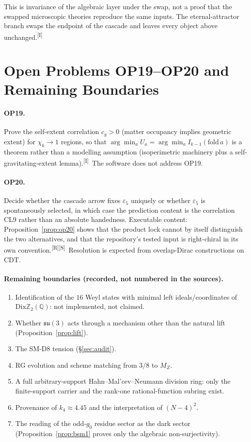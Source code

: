 \documentclass[11pt,a4paper]{article}
\theoremstyle{definition}
\theoremstyle{remark}
\newcommand{\DZ}{\mathrm{Dix}\mathbb{Z}_2(\mathbb{Q})}
\newcommand{\tR}{\textsuperscript{[R]}}
\newcommand{\tS}{\textsuperscript{[S]}}
\newcommand{\tI}{\textsuperscript{[I]}}
\begin{document}
\noindent This is invariance of the algebraic layer under the swap, not a proof that the swapped microscopic theories reproduce the same inputs. The eternal-attractor branch swaps the endpoint of the cascade and leaves every object above unchanged.\tI

\section{Open Problems OP19--OP20 and Remaining Boundaries}\label{sec:open}
\paragraph{OP19.} Prove the self-extent correlation $c_g>0$ (matter occupancy implies geometric extent) for $\chi_k\to1$ regions, so that $\arg\min_a U_a=\arg\min_a I_{k-1}(\mathrm{fold}\,a)$ is a theorem rather than a modelling assumption (isoperimetric machinery plus a self-gravitating-extent lemma).\tI\ The software does not address OP19.

\paragraph{OP20.} Decide whether the cascade arrow fixes $\varepsilon_5$ uniquely or whether $\varepsilon_5$ is spontaneously selected, in which case the prediction content is the correlation CL9 rather than an absolute handedness. Executable content: Proposition~\ref{prop:op20} shows that the product lock cannot by itself distinguish the two alternatives, and that the repository's tested input is right-chiral in its own convention.\tR\tS\ Resolution is expected from overlap-Dirac constructions on CDT.

\paragraph{Remaining boundaries (recorded, not numbered in the sources).}
\begin{enumerate}[label=(\alph*),leftmargin=*]
\item Identification of the $16$ Weyl states with minimal left ideals/coordinates of $\DZ$: not implemented, not claimed.
\item Whether $\mathfrak{su}(3)$ acts through a mechanism other than the natural lift (Proposition~\ref{prop:lift}).
\item The SM-D8 tension (\S\ref{sec:audit}).
\item RG evolution and scheme matching from $3/8$ to $M_Z$.
\item A full arbitrary-support Hahn--Mal'cev--Neumann division ring: only the finite-support carrier and the rank-one rational-function subring exist.
\item Provenance of $k_4\approx4.45$ and the interpretation of $(N-4)^2$.
\item The reading of the odd-$g_0$ residue sector as the dark sector (Proposition~\ref{prop:bsm1} proves only the algebraic non-surjectivity).
\end{enumerate}
\end{document}
